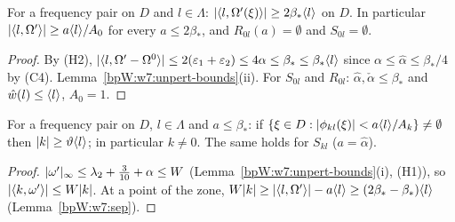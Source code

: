 \begin{lemma}[Normal separation; Melnikov conditions with $k=0$]\label{bpW:w7:sep}
For a frequency pair on $D$ and $l\in\Lambda$: $\lvert \langle l,\Omega'(\xi)\rangle\rvert\ge2\beta_*\langle l\rangle$ on $D$. In particular
$\lvert \langle l,\Omega'\rangle\rvert\ge a\langle l\rangle/A_0$ for every $a\le2\beta_*$, and $R_{0l}(a)=\emptyset$ and $S_{0l}=\emptyset$.
\end{lemma}
\begin{proof}
\label{stepW:w7:sep-drift}
By (H2), $\lvert \langle l,\Omega'-\Omega^0\rangle\rvert\le2(\varepsilon_1+\varepsilon_2)\le4\alpha\le\beta_*\le\beta_*\langle l\rangle$ since
$\alpha\le\hat\alpha\le\beta_*/4$ by (C4).
\label{stepW:w7:sep-concl}
Lemma~\ref{bpW:w7:unpert-bounds}(ii). For $S_{0l}$ and $R_{0l}$: $\hat\alpha,\check\alpha\le\beta_*$ and
$\hat w(l)\le\langle l\rangle$, $A_0=1$.
\end{proof}

\begin{lemma}\label{bpW:w7:largek}
For a frequency pair on $D$, $l\in\Lambda$ and $a\le\beta_*$: if
$\{\xi\in D:\lvert \phi_{kl}(\xi)\rvert<a\langle l\rangle/A_k\}\neq\emptyset$ then $\lvert k\rvert\ge\vartheta\langle l\rangle$; in particular $k\ne0$.
The same holds for $S_{kl}$ ($a=\hat\alpha$).
\end{lemma}
\begin{proof}
\label{stepW:w7:largek-tan}
$\lvert \omega'\rvert_\infty\le\lambda_2+\frac3{10}+\alpha\le W$ (Lemma~\ref{bpW:w7:unpert-bounds}(i), (H1)), so
$\lvert \langle k,\omega'\rangle\rvert\le W\lvert k\rvert$.
\label{stepW:w7:largek-cmp}
At a point of the zone, $W\lvert k\rvert\ge\lvert \langle l,\Omega'\rangle\rvert-a\langle l\rangle\ge(2\beta_*-\beta_*)\langle l\rangle$
(Lemma~\ref{bpW:w7:sep}).
\end{proof}

